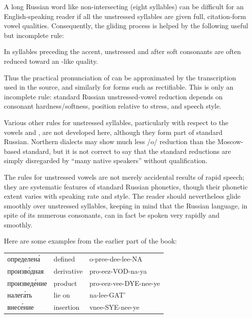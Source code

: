 A long Russian word like  non-intersecting (eight syllables) can be difficult for an English-speaking reader if all the unstressed syllables are given full, citation-form vowel qualities. Consequently, the gliding process is helped by the following useful but incomplete rule:

\begin{sourcebox}
In syllables preceding the accent, unstressed  and  after soft consonants are often reduced toward an -like quality.
\end{sourcebox}

Thus the practical pronunciation of  can be approximated by the transcription used in the source, and similarly for forms such as  rectifiable. This is only an incomplete rule: standard Russian unstressed-vowel reduction depends on consonant hardness/softness, position relative to stress, and speech style.

Various other rules for unstressed syllables, particularly with respect to the vowels  and , are not developed here, although they form part of standard Russian. Northern dialects may show much less /o/ reduction than the Moscow-based standard, but it is not correct to say that the standard reductions are simply disregarded by ``many native speakers'' without qualification.

The rules for unstressed vowels are not merely accidental results of rapid speech; they are systematic features of standard Russian phonetics, though their phonetic extent varies with speaking rate and style. The reader should nevertheless glide smoothly over unstressed syllables, keeping in mind that the Russian language, in spite of its numerous consonants, can in fact be spoken very rapidly and smoothly.

Here are some examples from the earlier part of the book:

\begin{center}
\begin{tabular}{@{}>{\cyrillicfont}l l l@{}}
определена́ & defined & o-pree-dee-lee-NA\\
произво́дная & derivative & pro-eez-VOD-na-ya\\
произведе́ние & product & pro-eez-vee-DYE-nee-ye\\
налега́ть & lie on & na-lee-GAT'\\
внесе́ние & insertion & vnee-SYE-nee-ye\\
\end{tabular}
\end{center}

